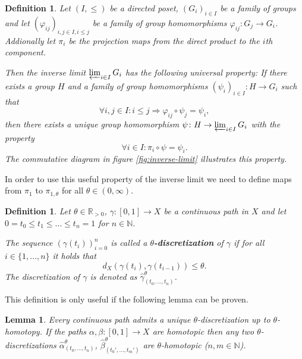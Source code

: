 \documentclass[a4paper, 11pt, twoside]{article}
\newcommand{\R}[0]{\mathbb{R}}
\newcommand{\N}[0]{\mathbb{N}}
\theoremstyle{break}
\theoremstyle{break}
\newtheorem{defin}[thm]{Definition}
\newtheorem{lemma}[thm]{Lemma}
\begin{document}
\begin{defin}
  Let $(I, \leq)$ be a directed poset, $(G_i)_{i\in I}$ be a family of groups and let $(\varphi_{ij})_{i,j \in I, i \leq j}$ be a family of group homomorphisms $\varphi_{ij} \colon G_j \to G_i$.
  Addionally let $\pi_i$ be the projection maps from the direct product to the $i$th component.
  
  Then the inverse limit $\varprojlim_{i\in I} G_i$ has the following universal property:
  If there exists a group $H$ and a family of group homomorphisms $(\psi_i)_{i\in I}\colon H \to G_i$ such that 
  \begin{equation*}
    \forall i,j \in I\colon i \leq j \Rightarrow \varphi_{ij} \circ \psi_j = \psi_i,
  \end{equation*}
  then there exists a unique group homomorphism $\psi\colon H \to \varprojlim_{i\in I} G_i$ with the property
  \begin{equation*}
    \forall i \in I\colon \pi_i \circ \psi = \psi_i.
  \end{equation*}
  The commutative diagram in figure \ref{fig:inverse-limit} illustrates this property.
\end{defin}

In order to use this useful property of the inverse limit we need to define maps from $\pi_1$ to $\pi_{1,\theta}$ for all $\theta \in (0,\infty)$. 
\begin{defin}
  Let $\theta \in \R_{>0}$, $\gamma\colon [0,1] \to X$ be a continuous path in $X$ and let $0 = t_0 \leq t_1 \leq \ldots \leq t_n = 1$ for $n \in \N$.

  The sequence $(\gamma(t_i))_{i=0}^n$ is called a \textbf{$\theta$-discretization} of $\gamma$ if for all $i \in \{1, \ldots, n\}$ it holds that
  \begin{equation*}
    d_X(\gamma(t_{i}), \gamma(t_{i-1})) \leq \theta.
  \end{equation*}
  The discretization of $\gamma$ is denoted as $\widehat{\gamma}^{\theta}_{(t_0, \ldots, t_n)}$.
\end{defin}

This definition is only useful if the following lemma can be proven.

\begin{lemma}\label{lem:discretization}
  Every continuous path admits a unique $\theta$-discretization up to $\theta$-homotopy. If the paths $\alpha, \beta\colon [0,1] \to X$ are homotopic then any two $\theta$-discretizations 
  $\widehat{\alpha}^{\theta}_{(t_0, \ldots, t_n)}$, $\widehat{\beta}^{\theta}_{(t_0', \ldots, t_m')}$ are $\theta$-homotopic ($n,m \in \N$).
\end{lemma}
\end{document}
